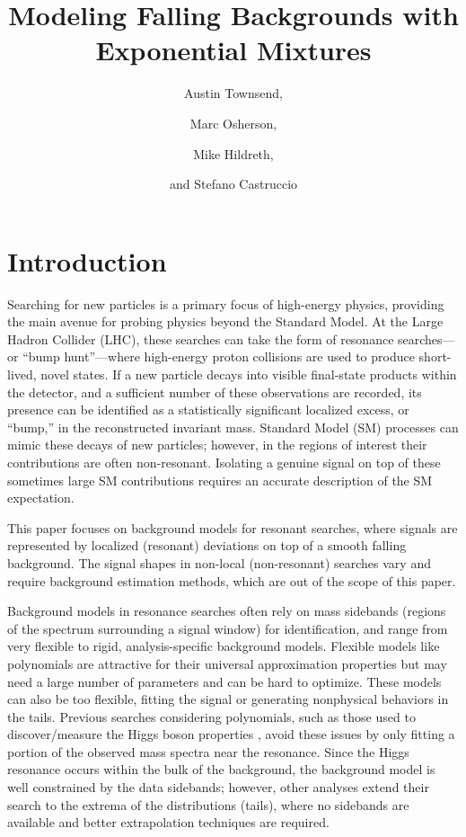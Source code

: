 \documentclass[a4paper,11pt]{article}
\title{Modeling Falling Backgrounds with Exponential Mixtures}
\author{Austin Townsend,}
\author{Marc Osherson,}
\author{Mike Hildreth, }
\author{and Stefano Castruccio}
\affiliation{University of Notre Dame, USA}
\begin{document}
\maketitle
\flushbottom

\section{Introduction}
\label{sec:intro}

Searching for new particles is a primary focus of high-energy physics, providing the main avenue for probing physics beyond the Standard Model. At the Large Hadron Collider (LHC), these searches can take the form of resonance searches—or ``bump hunt''—where high-energy proton collisions are used to produce short-lived, novel states. If a new particle decays into visible final-state products within the detector, and a sufficient number of these observations are recorded, its presence can be identified as a statistically significant localized excess, or ``bump,'' in the reconstructed invariant mass. Standard Model (SM) processes can mimic these decays of new particles; however, in the regions of interest their contributions are often non-resonant. Isolating a genuine signal on top of these sometimes large SM contributions requires an accurate description of the SM expectation.

This paper focuses on background models for resonant searches, where signals are 
represented by localized (resonant) deviations on top of a smooth falling background. The signal 
shapes in non-local (non-resonant) searches vary and require background estimation methods, which 
are out of the scope of this paper.

Background models in resonance searches often rely on mass sidebands (regions 
of the spectrum surrounding a signal window) for identification, and range from 
very flexible to rigid, analysis-specific background models. Flexible models like polynomials are attractive for their universal approximation properties but may need a large number of parameters and can 
be hard to optimize. These models can also be too flexible, fitting the signal or generating nonphysical behaviors in the tails. Previous searches considering polynomials, 
such as those used to discover/measure the Higgs boson properties \cite{CMS_Higgs_Discovery, Aad_2014}, avoid these issues by only fitting a portion of the observed mass spectra near the resonance. Since the Higgs resonance 
occurs within the bulk of the background, the background model is well constrained by the data 
sidebands; however, other analyses extend their search to the extrema of the distributions (tails), where no sidebands are 
available and better extrapolation techniques are required.
\end{document}
